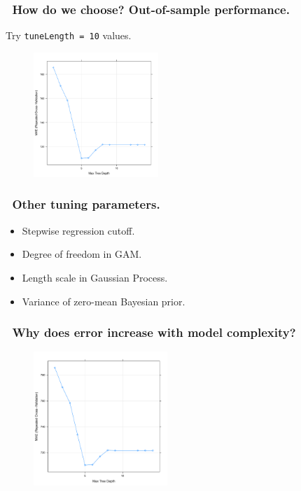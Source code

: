 \documentclass[handout, aspectratio = 169]{beamer}
\begin{document}
\begin{frame}
\frametitle{\insertframenumber~How do we choose? Out-of-sample performance.}
\vspace{3mm}
Try \texttt{tuneLength = 10} values.
\vspace{-3mm}
\begin{figure}
    \includegraphics[width = 0.42\textwidth]{rpart_perf.pdf}
\end{figure} 

\end{frame} 


\begin{frame}
\frametitle{\insertframenumber~Other tuning parameters.}
\begin{itemize}
\item Stepwise regression cutoff.
\item Degree of freedom in GAM.
\item Length scale in Gaussian Process.
\item Variance of zero-mean Bayesian prior.
\end{itemize}

\end{frame} 


\begin{frame}
\frametitle{\insertframenumber~Why does error  increase  with model complexity?}
\vspace{-4mm}
\begin{figure}
    \includegraphics[width = 0.45\textwidth]{rpart_perf.pdf}
\end{figure} 

\end{frame} 
\end{document}
